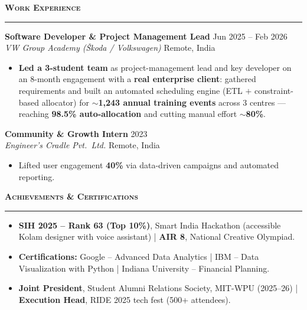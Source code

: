 \documentclass[a4paper,10pt]{article}
\newcommand{\sectionHeader}[2]{%
  \vspace{1.5pt}%
  \noindent%
  {\normalsize\bfseries\color{HeaderDark}#2\enspace\textsc{#1}}%
  \\[-6pt]%
  {\color{SectionLine}\rule{\textwidth}{1pt}}%
  \vspace{1pt}\par%
}
\newcommand{\expEntry}[4]{%
  \vspace{1pt}%
  \noindent\textbf{\color{HeaderDark}#1} \hfill {\small\color{SubText}#2}\\[-3pt]%
  {\small\color{MidGray}\textit{#3}} \hfill {\small\color{SubText}#4}%
  \vspace{0pt}\par%
}
\begin{document}

\sectionHeader{Work Experience}{\faLaptopCode}

\expEntry{Software Developer \& Project Management Lead}
  {Jun 2025 -- Feb 2026}
  {VW Group Academy (\v{S}koda / Volkswagen)}
  {Remote, India}

\begin{itemize}[leftmargin=14pt, itemsep=0pt, parsep=0pt, topsep=1pt, label={\color{BulletColor}\textbf{--}}]
  \item {\small \textbf{Led a 3-student team} as project-management lead and key developer on an 8-month engagement with a \textbf{real enterprise client}: gathered requirements and built an automated scheduling engine (ETL $+$ constraint-based allocator) for \textbf{$\sim$1,243 annual training events} across 3 centres --- reaching \textbf{98.5\% auto-allocation} and cutting manual effort \textbf{$\sim$80\%}.}
\end{itemize}

\vspace{1pt}

\expEntry{Community \& Growth Intern}
  {2023}
  {Engineer's Cradle Pvt.\ Ltd.}
  {Remote, India}

\begin{itemize}[leftmargin=14pt, itemsep=0pt, parsep=0pt, topsep=1pt, label={\color{BulletColor}\textbf{--}}]
  \item {\small Lifted user engagement \textbf{40\%} via data-driven campaigns and automated reporting.}
\end{itemize}


\sectionHeader{Achievements \& Certifications}{\faTrophy}

\begin{itemize}[leftmargin=14pt, itemsep=0pt, parsep=0pt, topsep=1pt, label={\color{BulletColor}$\bullet$}]
  \item {\small \textbf{SIH 2025 -- Rank 63 (Top 10\%)}, Smart India Hackathon (accessible Kolam designer with voice assistant) {\color{SubText}|} \textbf{AIR 8}, National Creative Olympiad.}
  \item {\small \textbf{Certifications:} Google -- Advanced Data Analytics {\color{SubText}|} IBM -- Data Visualization with Python {\color{SubText}|} Indiana University -- Financial Planning.}
  \item {\small \textbf{Joint President}, Student Alumni Relations Society, MIT-WPU (2025--26) {\color{SubText}|} \textbf{Execution Head}, RIDE 2025 tech fest (500+ attendees).}
\end{itemize}

\end{document}
